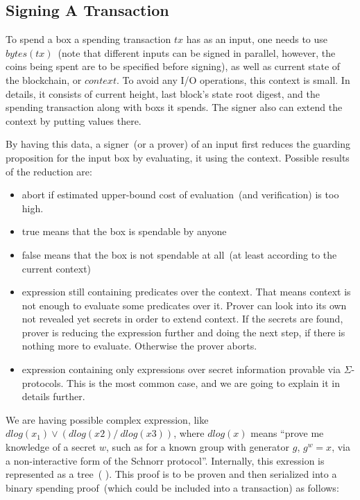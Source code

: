 \documentclass[]{article}   %
\newcommand{\authnote}[2]{\marginpar{\parbox{\marginparwidth}{\tiny %
  \textsf{#1 {\textcolor{blue}{notes: #2}}}}}%
  \textcolor{blue}{\textbf{\dag}}}
\newcommand{\authnote}[2]{
  \textsf{#1 \textcolor{blue}{: #2}}}
\newcommand{\authnote}[2]{}
\newcommand{\knote}[1]{{\authnote{\textcolor{green}{Alex notes}}{#1}}}
\newcommand{\coin}{box}
\begin{document}
\subsection{Signing A Transaction}

To spend a \coin{} a spending transaction $tx$ has as an input, one needs to use $bytes(tx)$~(note that different inputs
can be signed in parallel, however, the coins being spent are to be specified before signing), as well as current state
of the blockchain, or $context$. To avoid any I/O operations, this context is small. In details, it consists of current
height, last block's state root digest, and the spending transaction along with \coin{}s it spends. The signer also can
extend the context by putting values there.

By having this data, a signer~(or a prover) of an input first reduces the guarding proposition for the input \coin{} by
evaluating, it using the context. Possible results of the reduction are:

\begin{itemize}
    \item{abort} if estimated upper-bound cost of evaluation~(and verification) is too high.
    \item{true} means that the \coin{} is spendable by anyone
    \item{false} means that the \coin{} is not spendable at all~(at least according to the current context)
    \item{expression still containing predicates over the context. } That means context is not enough to evaluate
    some predicates over it. Prover can look into its own not revealed yet secrets in order to extend context. If the
    secrets are found, prover is reducing the expression further and doing the next step, if there is nothing more to
    evaluate. Otherwise the prover aborts.
    \item{expression containing only expressions over secret information provable via $\Sigma$-protocols. } This is the
    most common case, and we are going to explain it in details further.
\end{itemize}

We are having possible complex expression, like $dlog(x_1) \lor (dlog(x2) /\ dlog(x3))$, where $dlog(x)$ means ``prove me
knowledge of a secret $w$, such as for a known group with generator $g$, $g^w = x$, via a non-interactive form of the
Schnorr protocol''. Internally, this exression is represented as a tree~(\knote{draw the tree}). This proof is to be
proven and then serialized into a binary spending proof~(which could be included into a transaction) as follows:
\end{document}

